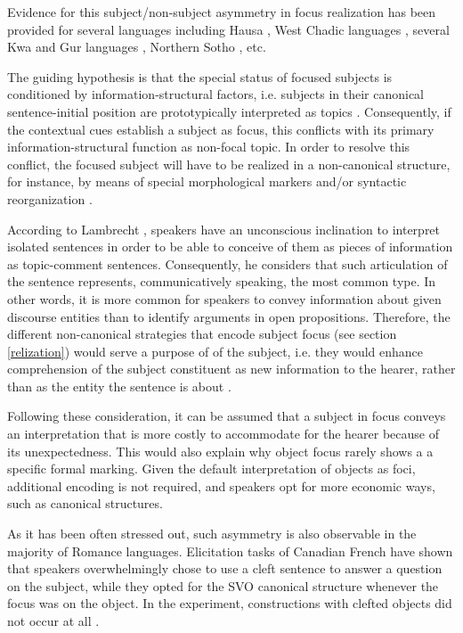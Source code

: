\documentclass[12pt]{report}
\begin{document}
Evidence for this subject/non-subject asymmetry in focus realization has been provided for several languages including Hausa \cite{hartmann2007place}, West Chadic languages \cite{zimmermann2011focus}, several Kwa and Gur languages \cite{fiedler2005out}, Northern Sotho \cite{zerbian2007investigating}, etc.

The guiding hypothesis is that the special status of focused subjects is conditioned by information-structural factors, i.e. subjects in their canonical sentence-initial position are prototypically interpreted as topics \cite{thompson1976subject}. Consequently, if the contextual cues establish a subject as focus, this conflicts with its primary information-structural function as non-focal topic. In order to resolve this conflict, the focused subject will have to be realized in a non-canonical structure, for instance, by means of special morphological markers and/or syntactic reorganization \cite{fiedler2006subject}.


According to Lambrecht \cite{lambrecht2010constraints}, speakers have an unconscious inclination to interpret isolated sentences in order to be able to conceive of them as pieces of information as topic-comment sentences. Consequently, he considers that such articulation of the sentence represents, communicatively speaking, the most common type. In other words, it is more common for speakers to convey information about given discourse entities than to identify arguments in open propositions. Therefore, the different non-canonical strategies that encode subject focus (see section \ref{relization}) would serve a purpose of  of the subject, i.e. they would enhance comprehension of the subject constituent as new information to the hearer, rather than as the entity the sentence is about \cite{reinhart1981pragmatics}.

Following these consideration, it can be assumed that a subject in focus conveys an interpretation that is more costly to accommodate for the hearer because of its  unexpectedness. This would also explain why object focus rarely shows a a specific formal marking. Given the default interpretation of objects as foci, additional encoding is not required, and speakers opt for more economic ways, such as canonical structures. 

As it has been often stressed out, such asymmetry is also observable in the majority of Romance languages. Elicitation tasks of Canadian French have shown that speakers overwhelmingly chose to use a cleft sentence to answer a question on the subject, while they opted for the SVO canonical structure whenever the focus was on the object. In the experiment, constructions with clefted objects did not occur at all \cite{skopeteas2010focus}. 
\end{document}
